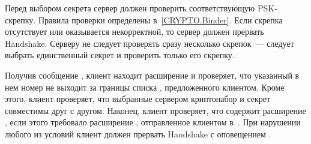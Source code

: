 


Перед выбором секрета сервер должен проверить соответствующую PSK-скрепку.
Правила проверки определены в~\ref{CRYPTO.Binder}. Если скрепка отсутствует или 
оказывается некорректной, то сервер должен прервать Handshake. Серверу не следует 
проверять сразу несколько скрепок~--- следует выбрать единственный секрет и 
проверить только его скрепку.


Получив сообщение , клиент находит расширение 
 и проверяет, что указанный в нем номер 
 не выходит за границы списка 
, предложенного клиентом.
%
Кроме этого, клиент проверяет, что выбранные сервером криптонабор и секрет 
совместимы друг с другом.
%
Наконец, клиент проверяет, что  содержит 
расширение , если этого требовало расширение 
, отправленное клиентом 
в~.
%
При нарушении любого из условий клиент должен прервать Handshake с оповещением
.

